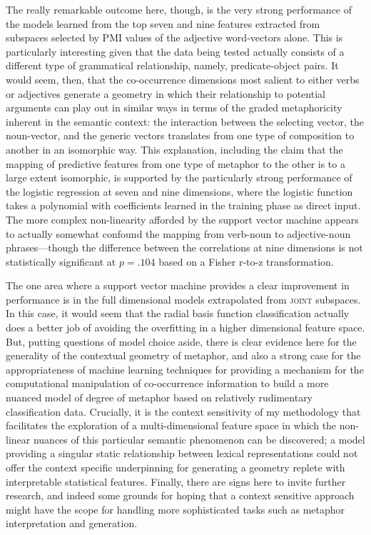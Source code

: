 The really remarkable outcome here, though, is the very strong performance of the models learned from the top seven and nine features extracted from subspaces selected by PMI values of the adjective word-vectors alone.  This is particularly interesting given that the data being tested actually consists of a different type of grammatical relationship, namely, predicate-object pairs.  It would seem, then, that the co-occurrence dimensions most salient to either verbs or adjectives generate a geometry in which their relationship to potential arguments can play out in similar ways in terms of the graded metaphoricity inherent in the semantic context: the interaction between the selecting vector, the noun-vector, and the generic vectors translates from one type of composition to another in an isomorphic way.  This explanation, including the claim that the mapping of predictive features from one type of metaphor to the other is to a large extent isomorphic, is supported by the particularly strong performance of the logistic regression at seven and nine dimensions, where the logistic function takes a polynomial with coefficients learned in the training phase as direct input.  The more complex non-linearity afforded by the support vector machine appears to actually somewhat confound the mapping from verb-noun to adjective-noun phrases---though the difference between the correlations at nine dimensions is not statistically significant at $p = .104$ based on a Fisher r-to-z transformation.

The one area where a support vector machine provides a clear improvement in performance is in the full dimensional models extrapolated from \textsc{joint} subspaces.  In this case, it would seem that the radial basis function classification actually does a better job of avoiding the overfitting in a higher dimensional feature space.  But, putting questions of model choice aside, there is clear evidence here for the generality of the contextual geometry of metaphor, and also a strong case for the appropriateness of machine learning techniques for providing a mechanism for the computational manipulation of co-occurrence information to build a more nuanced model of degree of metaphor based on relatively rudimentary classification data.  Crucially, it is the context sensitivity of my methodology that facilitates the exploration of a multi-dimensional feature space in which the non-linear nuances of this particular semantic phenomenon can be discovered; a model providing a singular static relationship between lexical representations could not offer the context specific underpinning for generating a geometry replete with interpretable statistical features.  Finally, there are signs here to invite further research, and indeed some grounds for hoping that a context sensitive approach might have the scope for handling more sophisticated tasks such as metaphor interpretation and generation.


